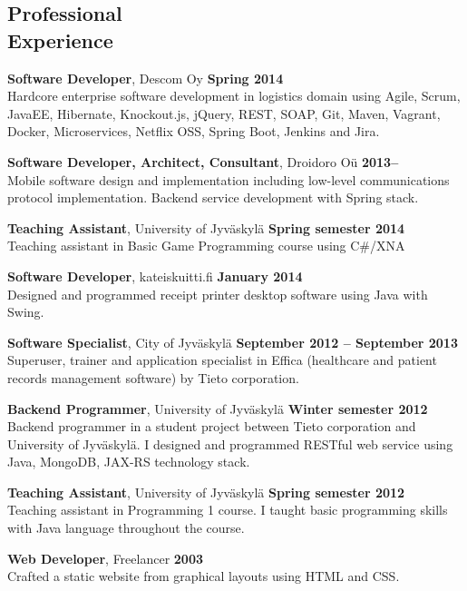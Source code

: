 \documentclass[margin,line]{resume}
\begin{document}
\begin{resume}
\section{\mysidestyle Professional\\Experience}

\textbf{Software Developer}, Descom Oy
\hfill\textbf{Spring 2014}\\
Hardcore enterprise software development in logistics domain using Agile, Scrum, JavaEE, Hibernate, Knockout.js, jQuery, REST, SOAP, Git, Maven, Vagrant, Docker, Microservices, Netflix OSS, Spring Boot, Jenkins and Jira.

\textbf{Software Developer, Architect, Consultant}, Droidoro Oü
\hfill\textbf{2013--}\\
Mobile software design and implementation including low-level communications protocol implementation. Backend service development with Spring stack.


\textbf{Teaching Assistant}, University of Jyväskylä  
\hfill\textbf{Spring semester 2014} \\
Teaching assistant in Basic Game Programming course using C\#/XNA

\textbf{Software Developer}, kateiskuitti.fi
\hfill\textbf{January 2014} \\
Designed and programmed receipt printer desktop software using Java with Swing.

\textbf{Software Specialist}, City of Jyväskylä
\hfill\textbf{September 2012 -- September 2013}\\
Superuser, trainer and application specialist in Effica (healthcare and patient records management software) by Tieto corporation.

\textbf{Backend Programmer}, University of Jyväskylä 
\hfill\textbf{Winter semester 2012}\\
Backend programmer in a student project between Tieto corporation and University of Jyväskylä. I designed and programmed RESTful web service using Java, MongoDB, JAX-RS technology stack.
    
\textbf{Teaching Assistant}, University of Jyväskylä  
\hfill\textbf{Spring semester 2012}\\
Teaching assistant in Programming 1 course. I taught basic programming skills with Java language throughout the course.

\textbf{Web Developer}, Freelancer
\hfill\textbf{2003}\\
Crafted a static website from graphical layouts using HTML and CSS.


\end{resume}
\end{document}
